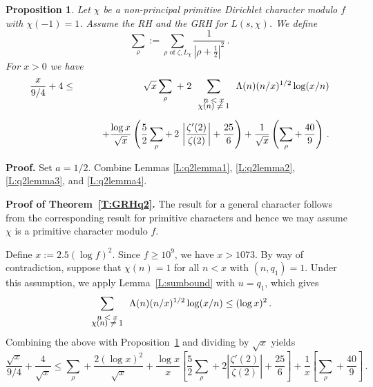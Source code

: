 \documentclass{amsart}
\newtheorem{proposition}[theorem]{Proposition}
\numberwithin{equation}{section}
\numberwithin{table}{section}
\begin{document}
\begin{proposition}\label{P:q2}
Let $\chi$ be a non-principal primitive Dirichlet character modulo $f$ with $\chi(-1)=1$.
Assume the RH and the GRH for $L(s,\chi)$.
We define
$$
  \sum_\rho:=\sum_{\rho\text{ of $\zeta,L_\chi$}}
  \frac{1}{\left|\rho+\frac{1}{2}\right|^2}
  \,.
$$
For $x>0$ we have
\begin{eqnarray*}
\frac{x}{9/4}+4
&\leq&
\sqrt{x}\sum_\rho
\;+\;
2
\sum_{\footnotesize{\begin{array}{cc}n<x\\[-1ex]\chi(n)\neq 1\end{array}}}
\Lambda(n)(n/x)^{1/2}\log(x/n)
\\[1ex]
&&
\qquad
+
\frac{\log x}{\sqrt{x}}
\left(
\frac{5}{2}
\sum_\rho
+
\,
2
\,
\left|\frac{\zeta'(2)}{\zeta(2)}\right|
+
\frac{25}{6}
\right)
+
\frac{1}{\sqrt{x}}
\left(
\sum_\rho
+\,
\frac{40}{9}
\right)
\,.
\end{eqnarray*}

\end{proposition}

\noindent\textbf{Proof.}
Set $a=1/2$.  Combine Lemmas
\ref{L:q2lemma1}, \ref{L:q2lemma2}, \ref{L:q2lemma3}, and \ref{L:q2lemma4}.
{\raisebox{-.25ex}{\scalebox{.786}[1.272]{$\blacksquare$}}}

\vspace{1ex}
\noindent\textbf{Proof of Theorem~\ref{T:GRHq2}.}
The result for a general character follows from the corresponding result for
primitive characters and hence we may assume $\chi$ is a primitive
character modulo $f$.

Define $x:=2.5(\log f)^2$.
Since $f\geq 10^{9}$, we have $x>1073$.
By way of contradiction,
suppose that $\chi(n)=1$ for all $n<x$ with $(n, q_1)=1$.
Under this assumption, we apply
Lemma~\ref{L:sumbound} with $u=q_1$, which gives
$$
  \sum_{\footnotesize{\begin{array}{cc}n<x\\[-1ex]\chi(n)\neq 1\end{array}}}
  \Lambda(n)(n/x)^{1/2}\log(x/n)
  \leq (\log x)^2
\,.
$$
Combining the above with Proposition~\ref{P:q2} and dividing by $\sqrt{x}$ yields
$$
  \frac{\sqrt{x}}{9/4}
  +
  \frac{4}{\sqrt{x}}
  \leq
  
  \sum_\rho
  +
  \frac{2(\log x)^2}{\sqrt{x}}
  +
  \frac{\log x}{x}
  \left[
  \frac{5}{2}\sum_\rho+
  2
  \left|\frac{\zeta'(2)}{\zeta(2)}\right|+\frac{25}{6}
  \right]
  +
  \frac{1}{x}
  \left[
  \sum_\rho
  +
  \frac{40}{9}
  \right]
  \,.
$$
\end{document}
